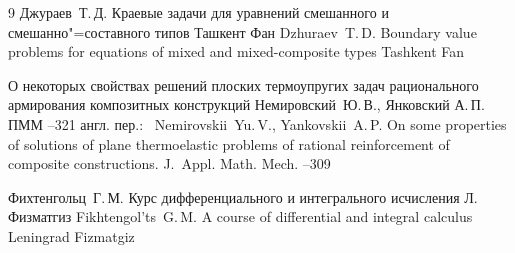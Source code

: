 \begin{thebibliography}{9}
\by Джураев~Т.\,Д.
\book Краевые задачи для уравнений смешанного и смешанно"=составного типов
\publaddr Ташкент
\publ Фан
\misctransl
\by Dzhuraev~T.\,D.
\book Boundary value problems for equations of mixed and mixed-composite types
\publaddr Tashkent
\publ Fan

\paper О некоторых свойствах решений плоских термоупругих задач рационального армирования композитных конструкций
\by Немировский~Ю.\,В., Янковский А.\,П.
\jour  ПММ
--321
\transl англ. пер.:~
\by Nemirovskii~Yu.\,V., Yankovskii~A.\,P.
\paper On some proper\-ties of solutions of plane thermoelastic problems of rational reinforcement of composite construc\-tions. \jour J.~Appl. Math. Mech. 
–309




\by Фихтенгольц~Г.\,М.
\book Курс дифференциального и интегрального исчисления
\publaddr Л.
\publ Физматгиз
\misctransl
\by Fikhtengol'ts~G.\,M.
\book A course of differential and integral calculus
\publaddr Leningrad
\publ Fizmatgiz


\end{thebibliography}

\noindent
\hskip6.5cm \thedate \par\noindent
\hskip6.5cm\therevdate\par

\newpage




\makeengtitlem

\newpage

%
%
